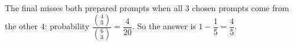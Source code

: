 The final misses both prepared prompts when all $3$ chosen prompts come from the other $4$: probability $\dfrac{\binom43}{\binom63}=\dfrac4{20}$. So the answer is $1-\dfrac15=\boxed{\dfrac45}$.
